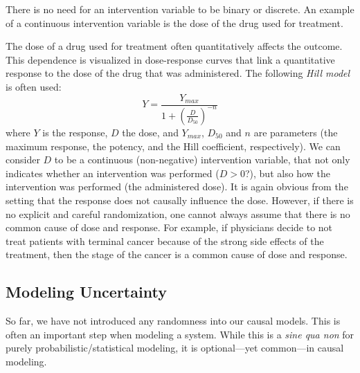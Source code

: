 There is no need for an intervention variable to be binary or discrete.
An example of a continuous intervention variable is the dose of the drug used for treatment.
\begin{Eg}
The dose of a drug used for treatment often quantitatively affects the outcome. 
This dependence is visualized in dose-response curves that link a quantitative response to the dose of the drug that was administered. 
The following \emph{Hill model} is often used:
$$Y = \frac{Y_{max}}{1 + \left(\frac{D}{D_{50}}\right)^{-n}}$$
where $Y$ is the response, $D$ the dose, and $Y_{max}$, $D_{50}$ and $n$ are parameters
(the maximum response, the potency, and the Hill coefficient, respectively).
We can consider $D$ to be a continuous (non-negative) intervention variable, that not only indicates whether an intervention was performed ($D > 0$?), but also how the intervention was performed (the administered dose).
It is again obvious from the setting that the response does not causally influence the dose.
However, if there is no explicit and careful randomization, one cannot always assume that there is no common cause of dose and response. 
For example, if physicians decide to not treat patients with terminal cancer because of the strong side effects of the treatment, then the stage of the cancer is a common cause of dose and response.
\end{Eg}


\subsection{Modeling Uncertainty}

So far, we have not introduced any randomness into our causal models. This is
often an important step when modeling a system. While this is a \emph{sine qua
non} for purely probabilistic/statistical modeling, it is optional---yet
common---in causal modeling. 

